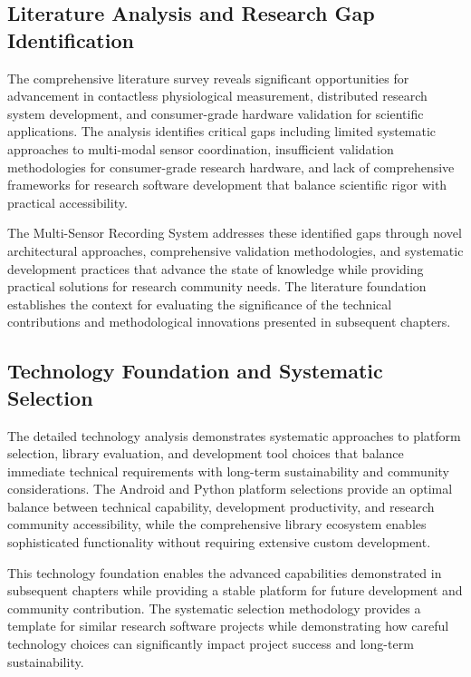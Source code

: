 \documentclass[11pt,a4paper]{report}
\begin{document}
\subsection{Literature Analysis and Research Gap Identification}

The comprehensive literature survey reveals significant opportunities for advancement in contactless physiological measurement, distributed research system development, and consumer-grade hardware validation for scientific applications. The analysis identifies critical gaps including limited systematic approaches to multi-modal sensor coordination, insufficient validation methodologies for consumer-grade research hardware, and lack of comprehensive frameworks for research software development that balance scientific rigor with practical accessibility.

The Multi-Sensor Recording System addresses these identified gaps through novel architectural approaches, comprehensive validation methodologies, and systematic development practices that advance the state of knowledge while providing practical solutions for research community needs. The literature foundation establishes the context for evaluating the significance of the technical contributions and methodological innovations presented in subsequent chapters.

\subsection{Technology Foundation and Systematic Selection}

The detailed technology analysis demonstrates systematic approaches to platform selection, library evaluation, and development tool choices that balance immediate technical requirements with long-term sustainability and community considerations. The Android and Python platform selections provide an optimal balance between technical capability, development productivity, and research community accessibility, while the comprehensive library ecosystem enables sophisticated functionality without requiring extensive custom development.

This technology foundation enables the advanced capabilities demonstrated in subsequent chapters while providing a stable platform for future development and community contribution. The systematic selection methodology provides a template for similar research software projects while demonstrating how careful technology choices can significantly impact project success and long-term sustainability.
\end{document}
